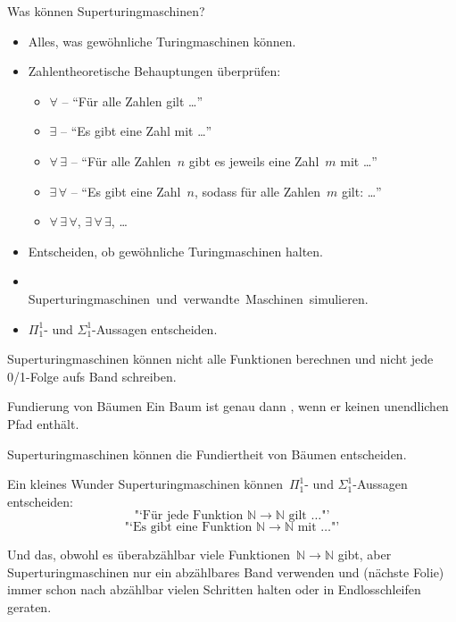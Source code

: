 \documentclass[12pt,compress,ngerman,utf8,t]{beamer}
\newcommand{\NN}{\mathbb{N}}
\newcommand{\hil}[1]{{\usebeamercolor[fg]{item}{\textbf{#1}}}}
\begin{document}
\begin{frame}{Was können Superturingmaschinen?}
  \begin{itemize}
    \item Alles, was gewöhnliche Turingmaschinen können.
    \item Zahlentheoretische Behauptungen überprüfen:
      \begin{itemize}
        \item $\forall$ -- "`Für alle Zahlen gilt \ldots"'    %
        \item $\exists$ -- "`Es gibt eine Zahl mit \ldots"'   %
        \item $\forall\,\exists$ -- "`Für alle Zahlen~$n$
        gibt es jeweils eine Zahl~$m$ mit \ldots"'            %
        \item $\exists\,\forall$ -- "`Es gibt eine Zahl~$n$,
        sodass für alle Zahlen~$m$ gilt: \ldots"'             %
        \item $\forall\,\exists\,\forall$,                    %
        $\exists\,\forall\,\exists$, \ldots
      \end{itemize}
    \item Entscheiden, ob gewöhnliche Turingmaschinen halten.
    \item \ \\[-1.2em]\mbox{Superturingmaschinen und verwandte Maschinen simulieren.}
    \item $\Pi_1^1$- und $\Sigma_1^1$-Aussagen entscheiden.
  \end{itemize}
  \pause

  \hil{Aber:} Superturingmaschinen können nicht alle Funktionen berechnen
  und nicht jede 0/1-Folge aufs Band schreiben.
\end{frame}

\begin{frame}{Fundierung von Bäumen}
  Ein Baum ist genau dann \hil{fundiert}, wenn er keinen unendlichen Pfad enthält.

  \begin{center}
    \scalebox{0.4}{}
  \end{center}

  Superturingmaschinen können die Fundiertheit von Bäumen entscheiden.
\end{frame}

\begin{frame}{Ein kleines Wunder}
  Superturingmaschinen können~$\Pi_1^1$- und $\Sigma_1^1$-Aussagen entscheiden:
  \[ \text{"`Für jede Funktion~$\NN \to \NN$ gilt \ldots"'} \]
  \[ \text{"`Es gibt eine Funktion~$\NN \to \NN$ mit \ldots"'} \]

  \vspace*{0.5em}
  Und das, obwohl es überabzählbar viele Funktionen~$\NN \to \NN$ gibt, aber
  Superturingmaschinen nur ein abzählbares Band verwenden und (nächste
  Folie) immer schon nach abzählbar vielen Schritten halten
  oder in Endlosschleifen geraten.
\end{frame}
\end{document}
